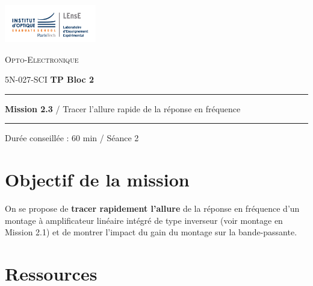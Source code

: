 \newpage
\pagestyle{empty}

\begin{minipage}[c]{.25\linewidth}
	\includegraphics[width=4cm]{images/Logo-LEnsE.png}
\end{minipage} \hfill
\begin{minipage}[c]{.4\linewidth}

\begin{center}
\vspace{0.3cm}
{\Large \textsc{Opto-Electronique}}

\medskip

5N-027-SCI \qquad \textbf{\Large TP Bloc 2}

\end{center}
\end{minipage}\hfill

\vspace{0.5cm}

\noindent \rule{\linewidth}{1pt}

{\noindent\Large \rule[-7pt]{0pt}{30pt}  \textbf{Mission 2.3} / Tracer l'allure rapide de la réponse en fréquence} 

\noindent \rule{\linewidth}{1pt}

\vspace{-0.5cm}

\begin{center}

Durée conseillée : 60 min / Séance 2

\end{center}

\section{Objectif de la mission}
\label{mission23}

On se propose de \textbf{tracer rapidement l'allure} de la réponse en fréquence d'un montage à amplificateur linéaire intégré de type inverseur (voir montage en Mission 2.1) et de montrer l'impact du gain du montage sur la bande-passante.


\section{Ressources}

